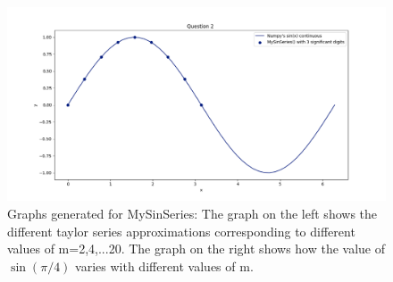 \documentclass[12pt]{article}
\begin{document}
\begin{figure}[H]
	\centering
	\includegraphics[width=0.7\linewidth]{graph3}
	\caption[Graphs generated for MySinSeries]{Graphs generated for MySinSeries: The graph on the left shows the different taylor series approximations corresponding to different values of m=2,4,...20. The graph on the right shows how the value of $\sin(\pi/4)$ varies with different values of m.}
	\label{fig:graph3}
\end{figure}
\end{document}
